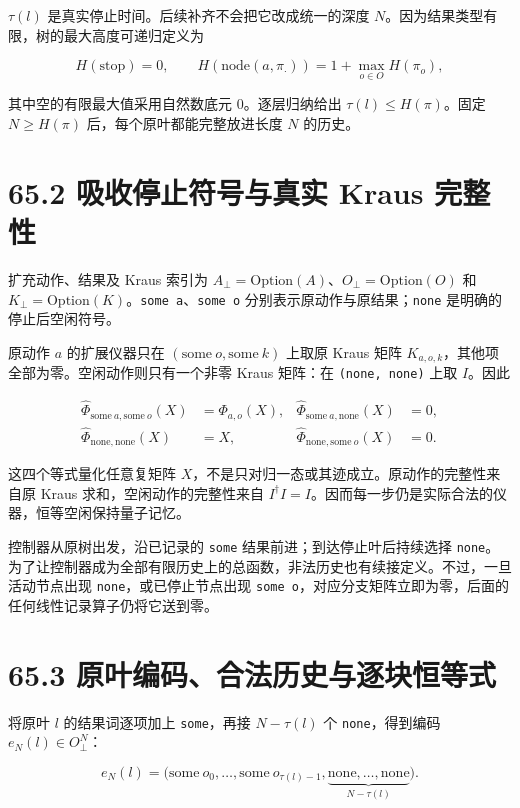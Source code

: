 \documentclass[
  11pt,
  oneside]{book}
\begin{document}
\(\tau(l)\) 是真实停止时间。后续补齐不会把它改成统一的深度
\(N\)。因为结果类型有限，树的最大高度可递归定义为

\[
H(\mathrm{stop})=0,
\qquad H(\mathrm{node}(a,\pi_\cdot))=1+\max_{o\in O}H(\pi_o),
\]

其中空的有限最大值采用自然数底元 \(0\)。逐层归纳给出
\(\tau(l)\le H(\pi)\)。固定 \(N\ge H(\pi)\) 后，每个原叶都能完整放进长度
\(N\) 的历史。

\section{65.2 吸收停止符号与真实 Kraus 完整性}

扩充动作、结果及 Kraus 索引为
\(A_\bot=\mathrm{Option}(A)\)、\(O_\bot=\mathrm{Option}(O)\) 和
\(K_\bot=\mathrm{Option}(K)\)。\texttt{some\ a}、\allowbreak \texttt{some\ o}
分别表示原动作与原结果；\texttt{none} 是明确的停止后空闲符号。

原动作 \(a\) 的扩展仪器只在 \((\mathrm{some}\ o,\mathrm{some}\ k)\)
上取原 Kraus 矩阵 \(K_{a,o,k}\)，其他项全部为零。空闲动作则只有一个非零
Kraus 矩阵：在 \texttt{(none,\ none)} 上取 \(I\)。因此

\[
\begin{aligned}
\widehat\Phi_{\mathrm{some}\ a,\mathrm{some}\ o}(X)&=\Phi_{a,o}(X),&
\widehat\Phi_{\mathrm{some}\ a,\mathrm{none}}(X)&=0,\\
\widehat\Phi_{\mathrm{none},\mathrm{none}}(X)&=X,&
\widehat\Phi_{\mathrm{none},\mathrm{some}\ o}(X)&=0.
\end{aligned}
\]

这四个等式量化任意复矩阵
\(X\)，不是只对归一态或其迹成立。原动作的完整性来自原 Kraus
求和，空闲动作的完整性来自
\(I^\dagger I=I\)。因而每一步仍是实际合法的仪器，恒等空闲保持量子记忆。

控制器从原树出发，沿已记录的 \texttt{some}
结果前进；到达停止叶后持续选择
\texttt{none}。为了让控制器成为全部有限历史上的总函数，非法历史也有续接定义。不过，一旦活动节点出现
\texttt{none}，或已停止节点出现
\texttt{some\ o}，对应分支矩阵立即为零，后面的任何线性记录算子仍将它送到零。

\section{65.3 原叶编码、合法历史与逐块恒等式}

将原叶 \(l\) 的结果词逐项加上 \texttt{some}，再接 \(N-\tau(l)\) 个
\texttt{none}，得到编码 \(e_N(l)\in O_\bot^N\)：

\[
e_N(l)=\bigl(\mathrm{some}\ o_0,\ldots,
\mathrm{some}\ o_{\tau(l)-1},
\underbrace{\mathrm{none},\ldots,\mathrm{none}}_{N-\tau(l)}\bigr).
\]
\end{document}
